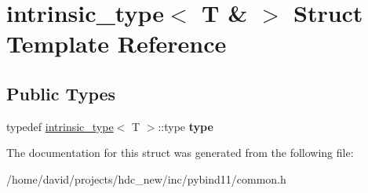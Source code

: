 \hypertarget{structintrinsic__type_3_01_t_01_6_01_4}{}\section{intrinsic\+\_\+type$<$ T \& $>$ Struct Template Reference}
\label{structintrinsic__type_3_01_t_01_6_01_4}
\subsection*{Public Types}
\begin{DoxyCompactItemize}
\item 
typedef \hyperlink{structintrinsic__type}{intrinsic\+\_\+type}$<$ T $>$\+::type {\bfseries type}\hypertarget{structintrinsic__type_3_01_t_01_6_01_4_a90278c08b44740ba70c14cc7ae7f8954}{}\label{structintrinsic__type_3_01_t_01_6_01_4_a90278c08b44740ba70c14cc7ae7f8954}

\end{DoxyCompactItemize}


The documentation for this struct was generated from the following file\+:\begin{DoxyCompactItemize}
\item 
/home/david/projects/hdc\+\_\+new/inc/pybind11/common.\+h\end{DoxyCompactItemize}
